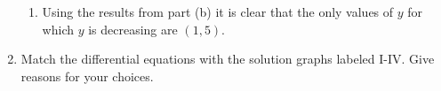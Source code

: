 \documentclass{article}
\begin{document}
\begin{enumerate}[label=\textbf{\arabic*.}]
\begin{enumerate}[label = (\alph*)]
\item Using the results from part (b) it is clear that the only values of $y$ for which $y$ is decreasing are $(1,5)$.
\end{enumerate}

\newpage


\item Match the differential equations with the solution graphs labeled I-IV. Give reasons for your choices. 
\end{enumerate}
\end{document}
